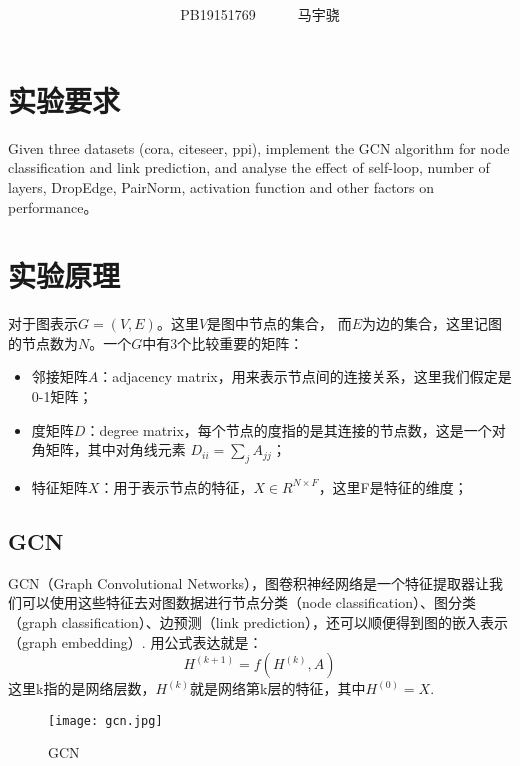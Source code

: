 \documentclass[a4paper,AutoFakeBold,AutoFakeSlant]{ctexart}
\title{\textbf{\textsf{\heiti{深度学习Lab4实验报告}}}}
\author{\ssong PB19151769~~~~~~马宇骁}
\date{}
\makeatletter
\renewcommand{\abstractname}{}    %
\renewenvironment{abstract}{%
      \if@twocolumn
        \section*{\abstractname}%
      \else
        \small
        \begin{center}%
          {\bfseries \abstractname\vspace{-.5em}\vspace{\z@}}%
        \end{center}%
      \fi}
      {}
\makeatother
\begin{document}
\maketitle



\section{实验要求}
Given three datasets (cora, citeseer, ppi), implement the GCN algorithm for node classification and link prediction, and analyse the effect of self-loop, number of layers, DropEdge, PairNorm, activation function and other factors on performance。


\section{实验原理}
对于图表示$G = (V, E)$。这里$V$是图中节点的集合，
而$E$为边的集合，这里记图的节点数为$N$。一个$G$中有3个比较重要的矩阵：
\begin{itemize}
  \item 邻接矩阵$A$：adjacency matrix，用来表示节点间的连接关系，这里我们假定是0-1矩阵；
  \item 度矩阵$D$：degree matrix，每个节点的度指的是其连接的节点数，这是一个对角矩阵，其中对角线元素 $D_{ii} = \sum_{j}A_{jj} $；
  \item 特征矩阵$X$：用于表示节点的特征，$ X\in R^{N\times F} $，这里F是特征的维度；
\end{itemize}

\subsection{GCN}
GCN（Graph Convolutional Networks），图卷积神经网络是一个特征提取器让我们可以使用这些特征去对图数据进行节点分类（node classification）、图分类（graph classification）、边预测（link prediction），还可以顺便得到图的嵌入表示（graph embedding）.
用公式表达就是：
\begin{equation}
  H^{(k+1)}=f\left(H^{(k)}, A\right)
\end{equation}
这里k指的是网络层数，$H^{(k)}$就是网络第k层的特征，其中$H^{(0)} = X$. 
\begin{figure}[htbp]
  \centering
  \texttt{[image: gcn.jpg]}
  \caption{GCN}
  \label{f1}
\end{figure}
\end{document}
